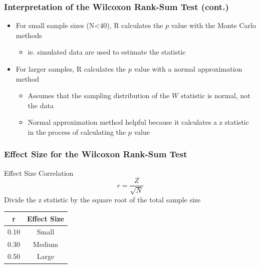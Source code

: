 \documentclass[12pt, block=fill]{beamer}
\begin{document}
\begin{frame}
  \frametitle{Interpretation of the Wilcoxon Rank-Sum Test (cont.)}
  
  \begin{itemize}
      \item For small sample sizes (N<40), R calculates the $p$ value with the Monte Carlo methods
      \begin{itemize}
          \item ie. simulated data are used to estimate the statistic
      \end{itemize}
      \item For larger samples, R calculates the $p$ value with a normal approximation method
      \begin{itemize}
          \item Assumes that the sampling distribution of the $W$ statistic is normal, not the data
          \item Normal approximation method helpful because it calculates a z statistic in the process of calculating the $p$ value
      \end{itemize}
  \end{itemize}
    
\end{frame}

\begin{frame}
  \frametitle{Effect Size for the Wilcoxon Rank-Sum Test}

  \begin{exampleblock}{Effect Size Correlation}
    $$r = \frac{Z}{ \sqrt{N} }$$
    Divide the z statistic by the square root of the total sample size
  \end{exampleblock}

  \begin{center}
  \begin{tabular}{c|c}
    r    & Effect Size  \\ \hline
    0.10 & Small \\
    0.30 & Medium \\
    0.50 & Large 
  \end{tabular}
  \end{center} 
\end{frame}

\end{document}
